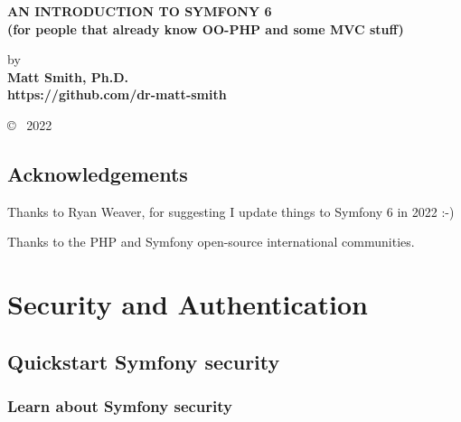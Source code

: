 \documentclass[a4paperpaper,openright]{book}
\date{}
\begin{document}
\begin{titlepage}
    \begin{center}
    
        \vspace*{1cm}
        

       \large{ \textbf{ \uppercase{An Introduction to Symfony 6}\\(for people that already know OO-PHP and some MVC stuff)}}
        
        \vspace{1.5cm}

        by\\
        \textbf{
        Matt Smith, Ph.D.\\https://github.com/dr-matt-smith
        }

       

        
        
        \vfill
  
            \copyright ~ 2022

     \end{center}
    \thispagestyle{empty}
\end{titlepage}

\newpage
\thispagestyle{empty}
\mbox{}

\frontmatter

\chapter{Acknowledgements}

Thanks to Ryan Weaver, for suggesting I update things to Symfony 6 in
2022 :-)

Thanks to the PHP and Symfony open-source international communities.

\tableofcontents

\mainmatter

\part{Security and Authentication}

\hypertarget{quickstart-symfony-security}{%
\chapter{Quickstart Symfony
security}\label{quickstart-symfony-security}}

\hypertarget{learn-about-symfony-security}{%
\section{Learn about Symfony
security}\label{learn-about-symfony-security}}
\end{document}
